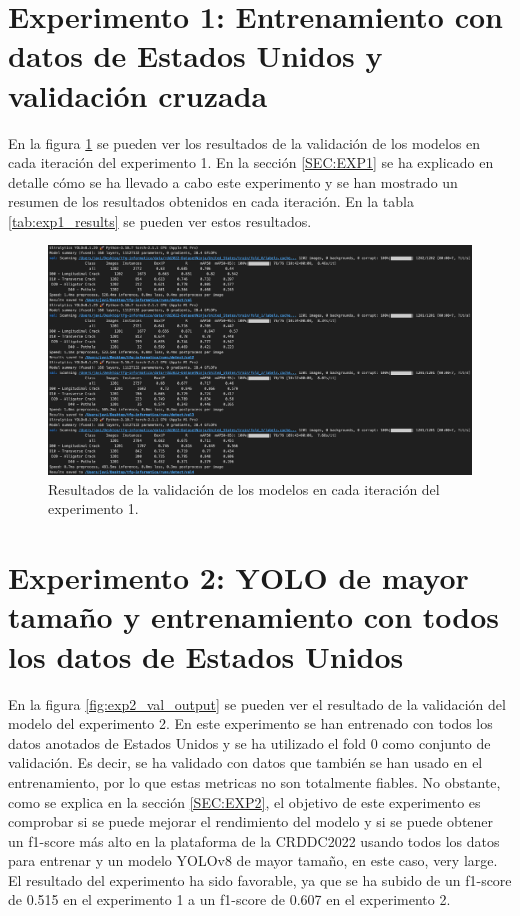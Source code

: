
\section{Experimento 1: Entrenamiento con datos de Estados Unidos y validación cruzada}
En la figura \ref{fig:exp1_val_output} se pueden ver los resultados de la validación de los modelos en cada iteración del experimento 1. En la sección \ref{SEC:EXP1} se ha explicado en detalle cómo se ha llevado a cabo este experimento y se han mostrado un resumen de los resultados obtenidos en cada iteración. En la tabla \ref{tab:exp1_results} se pueden ver estos resultados.

\begin{figure}[H]
    \centering
    \includegraphics[width=\textwidth,height=\textheight,keepaspectratio]{../img/exp1-val-output.png}
    \caption{Resultados de la validación de los modelos en cada iteración del experimento 1.}
    \label{fig:exp1_val_output}
\end{figure}

\section{Experimento 2: YOLO de mayor tamaño y entrenamiento con todos los datos de Estados Unidos}
En la figura \ref{fig:exp2_val_output} se pueden ver el resultado de la validación del modelo del experimento 2. En este experimento se han entrenado con todos los datos anotados de Estados Unidos y se ha utilizado el fold 0 como conjunto de validación. Es decir, se ha validado con datos que también se han usado en el entrenamiento, por lo que estas metricas no son totalmente fiables. No obstante, como se explica en la sección \ref{SEC:EXP2}, el objetivo de este experimento es comprobar si se puede mejorar el rendimiento del modelo y si se puede obtener un f1-score más alto en la plataforma de la CRDDC2022 usando todos los datos para entrenar y un modelo YOLOv8 de mayor tamaño, en este caso, very large. El resultado del experimento ha sido favorable, ya que se ha subido de un f1-score de 0.515 en el experimento 1 a un f1-score de 0.607 en el experimento 2.


